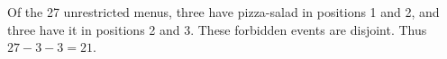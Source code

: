 Of the 27 unrestricted menus, three have pizza-salad in positions 1 and 2, and three have it in positions 2 and 3. These forbidden events are disjoint. Thus $27-3-3=\boxed{21}$.
